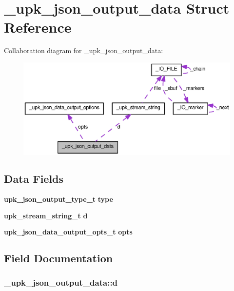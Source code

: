 \section{\_\-upk\_\-json\_\-output\_\-data Struct Reference}
\label{struct__upk__json__output__data}


Collaboration diagram for \_\-upk\_\-json\_\-output\_\-data:
\nopagebreak
\begin{figure}[H]
\begin{center}
\leavevmode
\includegraphics[width=400pt]{struct__upk__json__output__data__coll__graph}
\end{center}
\end{figure}
\subsection*{Data Fields}
\begin{DoxyCompactItemize}
\item 
{\bf upk\_\-json\_\-output\_\-type\_\-t} {\bf type}
\item 
{\bf upk\_\-stream\_\-string\_\-t} {\bf d}
\item 
{\bf upk\_\-json\_\-data\_\-output\_\-opts\_\-t} {\bf opts}
\end{DoxyCompactItemize}


\subsection{Field Documentation}
\subsubsection[{d}]{ {\bf \_\-upk\_\-json\_\-output\_\-data::d}}\label{struct__upk__json__output__data_a000ae48f20ba4c90b9597c3e5ac6ea30}


